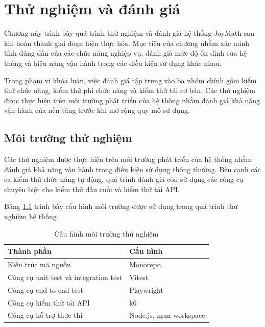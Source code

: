 \chapter{Thử nghiệm và đánh giá}

Chương này trình bày quá trình thử nghiệm và đánh giá hệ thống JoyMath sau khi hoàn thành giai đoạn hiện thực hóa. Mục tiêu của chương nhằm xác minh tính đúng đắn của các chức năng nghiệp vụ, đánh giá mức độ ổn định của hệ thống và hiệu năng vận hành trong các điều kiện sử dụng khác nhau.

Trong phạm vi khóa luận, việc đánh giá tập trung vào ba nhóm chính gồm kiểm thử chức năng, kiểm thử phi chức năng và kiểm thử tải cơ bản. Các thử nghiệm được thực hiện trên môi trường phát triển của hệ thống nhằm đánh giá khả năng vận hành của nền tảng trước khi mở rộng quy mô sử dụng.

\section{Môi trường thử nghiệm}

Các thử nghiệm được thực hiện trên môi trường phát triển của hệ thống nhằm đánh giá khả năng vận hành trong điều kiện sử dụng thông thường. Bên cạnh các ca kiểm thử chức năng tự động, quá trình đánh giá còn sử dụng các công cụ chuyên biệt cho kiểm thử đầu cuối và kiểm thử tải API.

Bảng \ref{tab:test-environment} trình bày cấu hình môi trường được sử dụng trong quá trình thử nghiệm hệ thống.

\begin{table}[H]
\centering
\caption{Cấu hình môi trường thử nghiệm}
\label{tab:test-environment}
\small
\begin{tabular}{|p{4.2cm}|p{8.5cm}|}
\hline
\textbf{Thành phần} & \textbf{Cấu hình} \\ \hline

Kiến trúc mã nguồn & Monorepo \\ \hline

Công cụ unit test và integration test & Vitest \\ \hline

Công cụ end-to-end test & Playwright \\ \hline

Công cụ kiểm thử tải API & k6 \\ \hline

Công cụ hỗ trợ thực thi & Node.js, npm workspace \\ \hline
\end{tabular}
\end{table}

